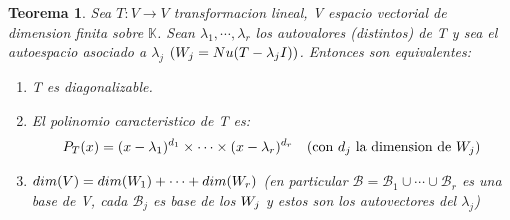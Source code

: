 \documentclass[]{article}
\newtheorem{theorem}{Teorema}
\newcommand{\K}{
    \mathbb{K}
}
\newcommand{\base}{\text{$\mathcal{B}$}}
\begin{document}
\begin{theorem}
    Sea $T:V\to V$ transformacion lineal, V espacio vectorial de dimension finita sobre $\K$.
    Sean $\lambda_1,\cdots,\lambda_r$ los autovalores (distintos) de T y sea  el autoespacio
    asociado a $\lambda_j$ $(\text{$W_{j}$}=Nu(T-\lambda_jI))$. Entonces son equivalentes:
    \begin{enumerate}
        \item T es diagonalizable.
        \item El polinomio caracteristico de T es:
        \begin{align*}
            P_T(x)= (x-\lambda_1)^{d_1}\times \cdots \times (x-\lambda_r)^{d_r}
            \quad \text{(con $d_j$ la dimension de \text{$W_{j}$})}
        \end{align*}
        \item $dim(V)=dim(\text{$W_{1}$})+\cdots +dim(\text{$W_{r}$})$ (en particular $\base=\base_1\cup\cdots\cup\base_r$
        es una base de V, cada $\base_j$ es base de los $\text{$W_{j}$}$ y estos son los autovectores del $\lambda_j$)\hfil
    \end{enumerate}
\end{theorem}
\end{document}
